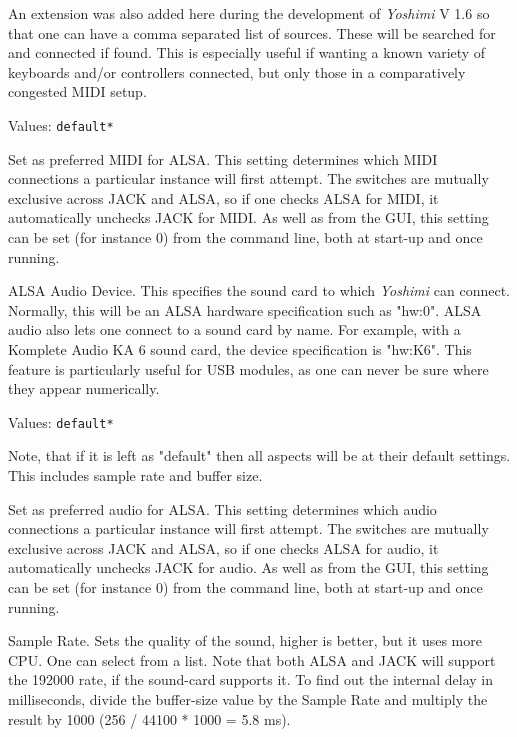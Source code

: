    An extension was also added here during the development of
   \textsl{Yoshimi} V 1.6 so that one can have a comma separated list of
   sources. These will be searched for and connected if found. This is
   especially useful if wanting a known variety of keyboards and/or
   controllers connected, but only those in a comparatively congested MIDI
   setup.

   Values: \texttt{default*}

   Set as preferred MIDI for ALSA.
   This setting determines which MIDI connections a particular instance will
   first attempt. The switches are mutually exclusive across JACK and ALSA,
   so if one checks ALSA for MIDI, it automatically unchecks JACK for MIDI.
   As well as from the GUI, this setting can be set (for instance 0) from the
   command line, both at start-up and once running.

   ALSA Audio Device.
   This specifies the sound card to which \textsl{Yoshimi} can connect.
   Normally, this will be an ALSA hardware specification such as
   "hw:0".
   ALSA audio also lets one connect to a sound card by name. For example,
   with a Komplete Audio KA 6 sound card, the device specification is
   "hw:K6". This feature is particularly useful for USB modules, as one can
   never be sure where they appear numerically.

   Values: \texttt{default*}

   Note, that if it is left as "default" then all aspects will be at their
   default settings. This includes sample rate and buffer size.

   Set as preferred audio for ALSA.
   This setting determines which audio connections a particular instance will
   first attempt. The switches are mutually exclusive across JACK and ALSA,
   so if one checks ALSA for audio, it automatically unchecks JACK for audio.
   As well as from the GUI, this setting can be set (for instance 0) from the
   command line, both at start-up and once running.

   Sample Rate.
   Sets the quality of the sound, higher is better, but it uses more CPU.  One
   can select from a list.  Note that both ALSA and JACK will support the
   192000 rate, if the sound-card supports it.  To find out the internal delay
   in milliseconds, divide the buffer-size value by the Sample Rate and
   multiply the result by 1000 (256 / 44100 * 1000 = 5.8 ms).

